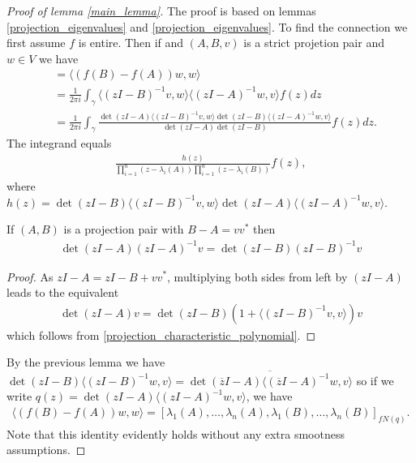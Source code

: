 \begin{proof}[Proof of lemma \ref{main_lemma}]
	The proof is based on lemmas \ref{projection_eigenvalues} and \ref{projection_eigenvalues}. To find the connection we first assume $f$ is entire. Then if and $(A, B, v)$ is a strict projetion pair and $w \in V$ we have
	\begin{align*}
		&= \langle (f(B) - f(A)) w, w \rangle \\
		&= \frac{1}{2 \pi i}\int_{\gamma} \langle (z I - B)^{-1} v, w \rangle  \langle (z I - A)^{-1} w, v \rangle f(z) dz \\
		&= \frac{1}{2 \pi i}\int_{\gamma} \frac{\det(z I - A)\langle (z I - B)^{-1} v, w \rangle \det(z I - B) \langle (z I - A)^{-1} w, v \rangle}{\det(z I - A) \det(z I - B)} f(z) dz.
	\end{align*}
	The integrand equals
	\begin{align*}
		\frac{h(z)}{\prod_{i = 1}^{n}(z - \lambda_{i}(A)) \prod_{i = 1}^{n}(z - \lambda_{i}(B))} f(z),
	\end{align*}
	where $h(z) = \det(z I - B)\langle (z I - B)^{-1} v, w \rangle \det(z I - A) \langle (z I - A)^{-1} w, v \rangle$.
	\begin{lem}
		If $(A, B)$ is a projection pair with $B - A = v v^{*}$ then
		\begin{align*}
			\det(z I - A) (z I - A)^{-1} v = \det(z I - B) (z I - B)^{-1} v
		\end{align*} 
	\end{lem}
	\begin{proof}
		As $z I - A = z I - B + v v^{*}$, multiplying both sides from left by $(z I - A)$ leads to the equivalent
		\begin{align*}
			\det(z I - A) v = \det(z I - B) (1 + \langle (z I - B)^{-1} v, v \rangle) v
		\end{align*}
		which follows from \ref{projection_characteristic_polynomial}.
	\end{proof}
	By the previous lemma we have $\det(z I - B) \langle (z I - B)^{-1} w, v \rangle = \overline{\det(\overline{z} I - A) \langle (\overline{z} I - A)^{-1} w, v \rangle}$ so
	if we write $q(z) = \det(z I - A) \langle (z I - A)^{-1} w, v \rangle$, we have
	\begin{align*}
		\langle (f(B) - f(A)) w, w \rangle = [\lambda_{1}(A), \ldots, \lambda_{n}(A), \lambda_{1}(B), \ldots, \lambda_{n}(B)]_{f N(q)}.
	\end{align*}
	Note that this identity evidently holds without any extra smootness assumptions.


\end{proof}
